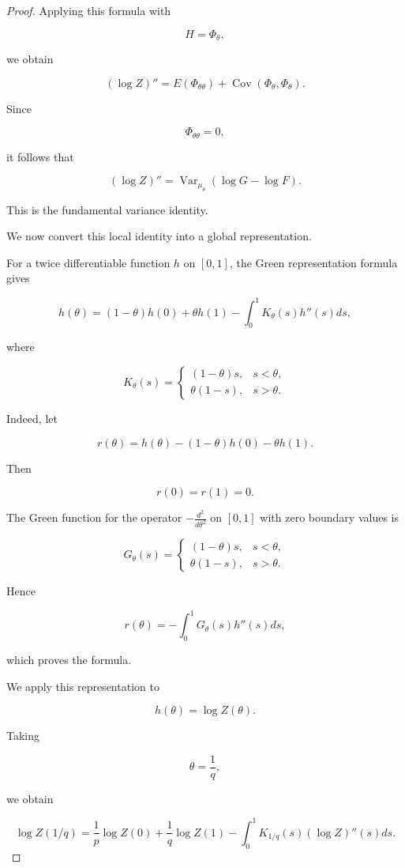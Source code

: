 \documentclass[11pt]{amsart}
\begin{document}
\begin{proof}
Applying this formula with

\[
H=\Phi_\theta ,
\]

we obtain

\[
(\log Z)''
=
E(\Phi_{\theta\theta})
+
\operatorname{Cov}
(\Phi_\theta,\Phi_\theta).
\]

Since

\[
\Phi_{\theta\theta}=0 ,
\]

it follows that

\[
\boxed{
(\log Z)''
=
\operatorname{Var}_{\mu_\theta}
(
\log G-\log F
).
}
\]

This is the fundamental variance identity.


We now convert this local identity into a global representation.

For a twice differentiable function $h$ on $[0,1]$,
the Green representation formula gives

\[
h(\theta)
=
(1-\theta)h(0)
+
\theta h(1)
-
\int_0^1
K_\theta(s)h''(s)ds ,
\]

where

\[
K_\theta(s)
=
\begin{cases}
(1-\theta)s,
&
s<\theta ,
\\[1ex]
\theta(1-s),
&
s>\theta .
\end{cases}
\]


Indeed, let

\[
r(\theta)
=
h(\theta)
-
(1-\theta)h(0)
-
\theta h(1).
\]

Then

\[
r(0)=r(1)=0 .
\]

The Green function for the operator
$-\frac{d^2}{d\theta^2}$ on $[0,1]$
with zero boundary values is

\[
G_\theta(s)
=
\begin{cases}
(1-\theta)s,
&
s<\theta ,
\\[1ex]
\theta(1-s),
&
s>\theta .
\end{cases}
\]

Hence

\[
r(\theta)
=
-\int_0^1
G_\theta(s)h''(s)ds ,
\]

which proves the formula.


We apply this representation to

\[
h(\theta)=\log Z(\theta).
\]

Taking

\[
\theta=\frac1q ,
\]

we obtain

\[
\log Z(1/q)
=
\frac1p\log Z(0)
+
\frac1q\log Z(1)
-
\int_0^1
K_{1/q}(s)
(\log Z)''(s)ds .
\]



\end{proof}
\end{document}
